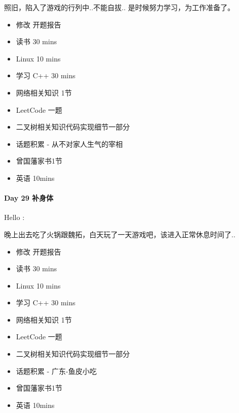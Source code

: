 \documentclass[UTF8,a4paper,8pt]{ctexbook}
\begin{document}
	 	 照旧，陷入了游戏的行列中..不能自拔.. 是时候努力学习，为工作准备了。
	 	 
	 	 \begin{itemize}
	 	 	\item \makebox[0pt][l]{$\square$}\raisebox{.15ex}{\hspace{0.1em}$\checkmark$}修改  开题报告
	 	 	\item \makebox[0pt][l]{$\square$}\raisebox{.15ex}{\hspace{0.1em}$\checkmark$}读书       30 mins	
	 	 	\item \makebox[0pt][l]{$\square$}\raisebox{.15ex}{\hspace{0.1em}$\checkmark$}Linux      10 mins	  
	 	 	\item 学习  C++  30 mins 
	 	 	
	 	 	\item  网络相关知识 1节
	 	 	\item  LeetCode    一题
	 	 	\item  二叉树相关知识代码实现细节一部分 
	 	 	
	 	 	\item  \makebox[0pt][l]{$\square$}\raisebox{.15ex}{\hspace{0.1em}$\checkmark$}话题积累 	- 从不对家人生气的宰相
	 	 	\item  曾国藩家书1节
	 	 	\item  英语 10mins
	 	 \end{itemize}
 	 \paragraph{Day 29   补身体   \quad     } 
	 	 Hello :
	 	 
	 	 晚上出去吃了火锅跟魏拓，白天玩了一天游戏吧，该进入正常休息时间了..
	 	 \begin{itemize}
	 	 	\item 修改  开题报告
	 	 	\item \makebox[0pt][l]{$\square$}\raisebox{.15ex}{\hspace{0.1em}$\checkmark$}读书       30 mins	
	 	 	\item \makebox[0pt][l]{$\square$}\raisebox{.15ex}{\hspace{0.1em}$\checkmark$}Linux      10 mins	  
	 	 	\item 学习  C++  30 mins 
	 	 	
	 	 	\item  网络相关知识 1节
	 	 	\item  LeetCode    一题
	 	 	\item  二叉树相关知识代码实现细节一部分 
	 	 	
	 	 	\item  \makebox[0pt][l]{$\square$}\raisebox{.15ex}{\hspace{0.1em}$\checkmark$}话题积累 	- 广东-鱼皮小吃
	 	 	\item  曾国藩家书1节
	 	 	\item  英语 10mins
	 	 \end{itemize}  
\end{document}
